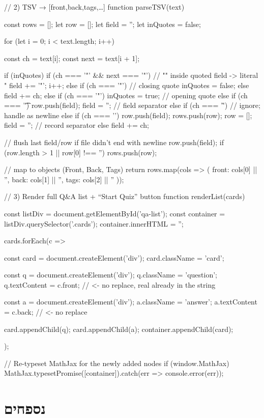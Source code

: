 \documentclass{tstextbook}
\begin{document}
    // 2) TSV → [{front,back,tags},…]
    function parseTSV(text) {
  const rows = [];
  let row = [];
  let field = '';
  let inQuotes = false;

  for (let i = 0; i < text.length; i++) {
    const ch = text[i];
    const next = text[i + 1];

    if (inQuotes) {
      if (ch === '"' && next === '"') {
        // "" inside quoted field -> literal "
        field += '"';
        i++;
      } else if (ch === '"') {
        // closing quote
        inQuotes = false;
      } else {
        field += ch;
      }
    } else {
      if (ch === '"') {
        inQuotes = true;                // opening quote
      } else if (ch === '\t') {
        row.push(field); field = '';    // field separator
      } else if (ch === '\r') {
        // ignore; handle \n as newline
      } else if (ch === '\n') {
        row.push(field); rows.push(row);
        row = []; field = '';           // record separator
      } else {
        field += ch;
      }
    }
  }
  // flush last field/row if file didn't end with newline
  row.push(field);
  if (row.length > 1 || row[0] !== '') rows.push(row);

  // map to objects (Front, Back, Tags)
  return rows.map(cols => ({
    front: cols[0] || '',
    back:  cols[1] || '',
    tags:  cols[2] || ''
  }));
}
// 3) Render full Q&A list + “Start Quiz” button
function renderList(cards) {
  const listDiv = document.getElementById('qa-list');
  const container = listDiv.querySelector('.cards');
  container.innerHTML = '';

  cards.forEach(c => {
    const card = document.createElement('div');
    card.className = 'card';

    const q = document.createElement('div');
    q.className = 'question';
    q.textContent = c.front;   // <- no replace, real \n already in the string

    const a = document.createElement('div');
    a.className = 'answer';
    a.textContent = c.back;    // <- no replace

    card.appendChild(q);
    card.appendChild(a);
    container.appendChild(card);
  });

  // Re-typeset MathJax for the newly added nodes
  if (window.MathJax) {
    MathJax.typesetPromise([container]).catch(err => console.error(err));
  }
}
  \chapter{נספחים}
\end{document}
